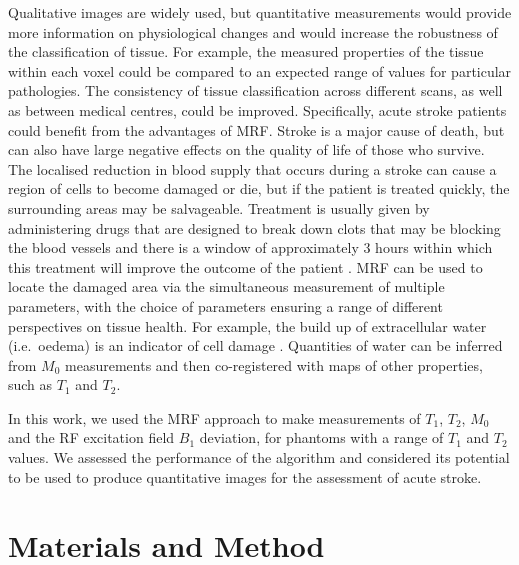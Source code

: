 \documentclass[journal]{IEEEtran}
\begin{document}
Qualitative images are widely used, but quantitative measurements would provide more information on physiological changes and would increase the robustness of the classification of tissue. For example, the measured properties of the tissue within each voxel could be compared to an expected range of values for particular pathologies. The consistency of tissue classification across different scans, as well as between medical centres, could be improved. Specifically, acute stroke patients could benefit from the advantages of MRF. Stroke is a major cause of death, but can also have large negative effects on the quality of life of those who survive. The localised reduction in blood supply that occurs during a stroke can cause a region of cells to become damaged or die, but if the patient is treated quickly, the surrounding areas may be salvageable. Treatment is usually given by administering drugs that are designed to break down clots that may be blocking the blood vessels and there is a window of approximately 3 hours within which this treatment will improve the outcome of the patient \cite{alper2015thrombolysis}. MRF can be used to locate the damaged area via the simultaneous measurement of multiple parameters, with the choice of parameters ensuring a range of different perspectives on tissue health. For example, the build up of extracellular water (i.e.\ oedema) is an indicator of cell damage \cite{harston2015imaging, ayata2002ischaemic}. Quantities of water can be inferred from $M_{0}$ measurements and then co-registered with maps of other properties, such as $T_1$ and $T_2$. 

In this work, we used the MRF approach to make measurements of $T_{1}$, $T_{2}$, $M_{0}$ and the RF excitation field $B_{1}$ deviation, for phantoms with a range of $T_{1}$ and $T_{2}$ values. We assessed the performance of the algorithm and considered its potential to be used to produce quantitative images for the assessment of acute stroke.

\section{Materials and Method}
\end{document}
